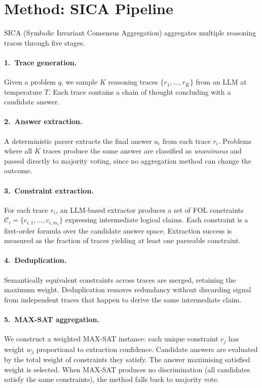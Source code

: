 \documentclass[11pt]{article}
\begin{document}
\section{Method: SICA Pipeline}
\label{sec:method}

SICA (Symbolic Invariant Consensus Aggregation) aggregates multiple reasoning traces through five stages.

\paragraph{1.\ Trace generation.}
Given a problem $q$, we sample $K$ reasoning traces $\{r_1, \ldots, r_K\}$ from an LLM at temperature $T$.
Each trace contains a chain of thought concluding with a candidate answer.

\paragraph{2.\ Answer extraction.}
A deterministic parser extracts the final answer $a_i$ from each trace $r_i$.
Problems where all $K$ traces produce the same answer are classified as \emph{unanimous} and passed directly to majority voting, since no aggregation method can change the outcome.

\paragraph{3.\ Constraint extraction.}
For each trace $r_i$, an LLM-based extractor produces a set of FOL constraints $\mathcal{C}_i = \{c_{i,1}, \ldots, c_{i,m_i}\}$ expressing intermediate logical claims.
Each constraint is a first-order formula over the candidate answer space.
Extraction success is measured as the fraction of traces yielding at least one parseable constraint.

\paragraph{4.\ Deduplication.}
Semantically equivalent constraints across traces are merged, retaining the maximum weight.
Deduplication removes redundancy without discarding signal from independent traces that happen to derive the same intermediate claim.

\paragraph{5.\ MAX-SAT aggregation.}
We construct a weighted MAX-SAT instance: each unique constraint $c_j$ has weight $w_j$ proportional to extraction confidence.
Candidate answers are evaluated by the total weight of constraints they satisfy.
The answer maximising satisfied weight is selected.
When MAX-SAT produces no discrimination (all candidates satisfy the same constraints), the method falls back to majority vote.
\end{document}
